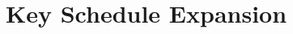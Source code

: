 \documentclass[report.tex]{subfiles}
\begin{document}
\section{Key Schedule Expansion}
\label{sec:impl key schedule}
\end{document}
